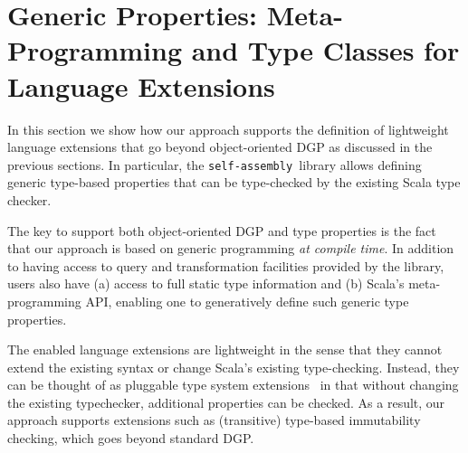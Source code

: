 \documentclass[preprint]{sigplanconf}
\newcommand{\selfassembly}{\texttt{self-assembly~}}
\begin{document}
\section{Generic Properties: Meta-Programming and Type Classes for Language Extensions}
\label{sec:language-extensions}

In this section we show how our approach supports the definition of
lightweight language extensions that go beyond object-oriented DGP as
discussed in the previous sections. In particular, the \selfassembly library
allows defining generic type-based properties that can be type-checked by the
existing Scala type checker.


The key to support both object-oriented DGP and type properties is the fact
that our approach is based on generic programming {\em at compile time}. In
addition to having access to query and transformation facilities provided by
the library, users also have (a) access to full static type information and
(b) Scala's meta-programming API, enabling one to generatively define such
generic type properties.

The enabled language extensions are lightweight in the sense that they cannot
extend the existing syntax or change Scala’s existing type-checking. Instead,
they can be thought of as pluggable type system
extensions~\cite{PluggableTypes} in that without changing the existing
typechecker, additional properties can be checked. As a result, our approach
supports extensions such as (transitive) type-based immutability checking,
which goes beyond standard DGP.


\end{document}
